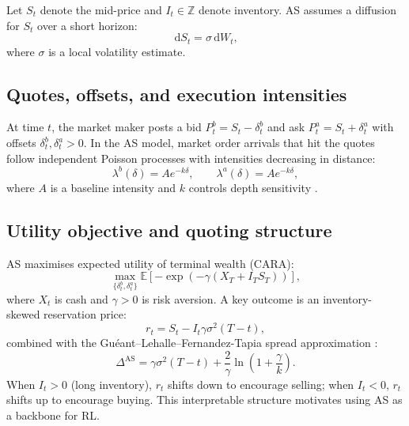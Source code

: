 \documentclass[11pt]{article}
\newcommand{\E}{\mathbb{E}}
\newcommand{\dd}{\,\mathrm{d}}
\begin{document}
Let $S_t$ denote the mid-price and $I_t \in \mathbb{Z}$ denote inventory.
AS assumes a diffusion for $S_t$ over a short horizon:
\begin{equation}
  \dd S_t = \sigma \dd W_t,
\end{equation}
where $\sigma$ is a local volatility estimate.

\subsection{Quotes, offsets, and execution intensities}

At time $t$, the market maker posts a bid $P_t^b = S_t - \delta_t^b$
and ask $P_t^a = S_t + \delta_t^a$ with offsets $\delta_t^b,\delta_t^a > 0$.
In the AS model, market order arrivals that hit the quotes follow
independent Poisson processes with intensities decreasing in distance:
\begin{equation}
  \lambda^b(\delta) = A e^{-k\delta},
  \qquad
  \lambda^a(\delta) = A e^{-k\delta},
\end{equation}
where $A$ is a baseline intensity and $k$ controls depth sensitivity
\parencite{avellaneda2008hftlob}.

\subsection{Utility objective and quoting structure}

AS maximises expected utility of terminal wealth (CARA):
\begin{equation}
  \max_{\{\delta_t^b,\delta_t^a\}} \E\left[
    -\exp\!\left(-\gamma \left(X_T + I_T S_T\right)\right)
  \right],
\end{equation}
where $X_t$ is cash and $\gamma>0$ is risk aversion.
A key outcome is an inventory-skewed reservation price:
\begin{equation}
  r_t = S_t - I_t \gamma \sigma^2 (T-t),
  \label{eq:reservation}
\end{equation}
combined with the Gu\'{e}ant--Lehalle--Fernandez-Tapia spread approximation
\parencite{gueant2013inventory}:
\begin{equation}
  \Delta^{\text{AS}} = \gamma \sigma^2 (T-t)
    + \frac{2}{\gamma}\ln\!\left(1 + \frac{\gamma}{k}\right).
  \label{eq:gueant_spread_prelim}
\end{equation}
When $I_t>0$ (long inventory), $r_t$ shifts down to encourage selling;
when $I_t<0$, $r_t$ shifts up to encourage buying.
This interpretable structure motivates using AS as a backbone for RL.
\end{document}
